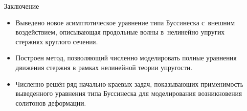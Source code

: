 \documentclass[usenames,dvipsnames]{beamer}
\begin{document}
\begin{frame}{Заключение}
\begin{itemize}
	\item Выведено 
	новое асимптотическое уравнение типа Буссинеска с~внешним воздействием, описывающая продольные волны в~нелинейно упругих стержнях круглого сечения.
	\item Построен метод, позволяющий численно моделировать полные уравнения движения стержня в рамках нелинейной теории упругости.
	\item Численно решён ряд начально-краевых задач, показывающих применимость выведенного уравнения типа Буссинеска для моделирования возникновения солитонов деформации.
\end{itemize}

\end{frame}
\end{document}

